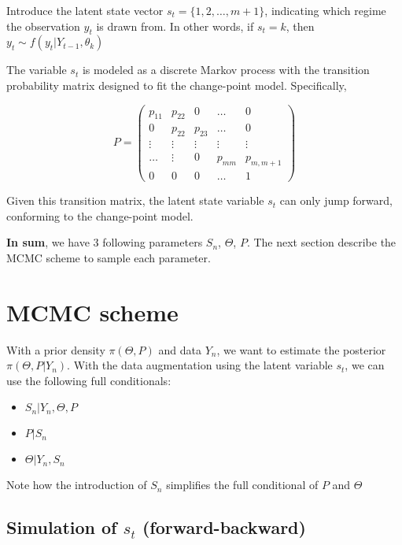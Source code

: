 \documentclass{article}
\begin{document}
Introduce the latent state vector $s_t = \{1, 2, \dots, m + 1\}$,
indicating which regime the observation $y_t$ is drawn from. In other
words, if $s_t = k$, then $y_t \sim f(y_t | Y_{t-1}, \theta_k)$

The variable $s_t$ is modeled as a discrete Markov process with the
transition probability matrix designed to fit the change-point model.
Specifically,

\[
P = \left(\begin{matrix}
p_{11} & p_{22} & 0 & \dots & 0 \\
0 & p_{22} & p_{23} & \dots & 0 \\
\vdots & \vdots & \vdots & \vdots & \vdots \\
\dots & \vdots & 0 & p_{mm} & p_{m,m+1} \\
0 & 0 & 0 & \dots & 1
\end{matrix}\right)
\]

Given this transition matrix, the latent state variable $s_t$ can only
jump forward, conforming to the change-point model.

\textbf{In sum}, we have 3 following parameters $S_n$, $\Theta$, $P$.
The next section describe the MCMC scheme to sample each parameter.

    \section{MCMC scheme}\label{mcmc-scheme}

With a prior density $\pi(\Theta, P)$ and data $Y_n$, we want to
estimate the posterior $\pi(\Theta, P | Y_n)$. With the data
augmentation using the latent variable $s_t$, we can use the following
full conditionals:

\begin{itemize}
\itemsep1pt\parskip0pt
\item
  $S_n | Y_n, \Theta, P$
\item
  $P | S_n$
\item
  $\Theta | Y_n, S_n$
\end{itemize}

Note how the introduction of $S_n$ simplifies the full conditional of
$P$ and $\Theta$

    \subsection{Simulation of ${s_t}$
(forward-backward)}\label{simulation-of-sux5ft-forward-backward}
\end{document}
